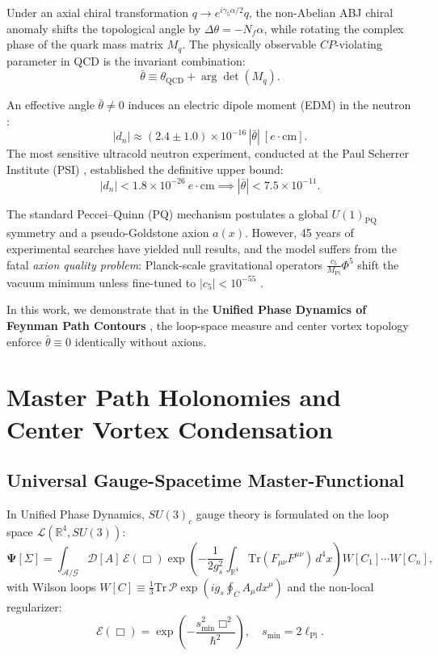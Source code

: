 \documentclass[11pt,a4paper]{article}
\begin{document}
Under an axial chiral transformation $q \to e^{i\gamma_5 \alpha/2} q$, the non-Abelian ABJ chiral anomaly shifts the topological angle by $\Delta\theta = -N_f \alpha$, while rotating the complex phase of the quark mass matrix $M_q$. The physically observable $CP$-violating parameter in QCD is the invariant combination:
\begin{equation}
\bar{\theta} \equiv \theta_{\mathrm{QCD}} + \arg\det(M_q).
\end{equation}

An effective angle $\bar{\theta} \ne 0$ induces an electric dipole moment (EDM) in the neutron \cite{Crewther1979}:
\begin{equation}
|d_n| \approx (2.4 \pm 1.0) \times 10^{-16} \, |\bar{\theta}| \ [e \cdot \text{cm}].
\end{equation}
The most sensitive ultracold neutron experiment, conducted at the Paul Scherrer Institute (PSI) \cite{Abel2020}, established the definitive upper bound:
\begin{equation}
|d_n| < 1.8 \times 10^{-26} \ e \cdot \text{cm} \implies |\bar{\theta}| < 7.5 \times 10^{-11}.
\end{equation}

The standard Peccei--Quinn (PQ) mechanism \cite{Peccei1977} postulates a global $U(1)_{\mathrm{PQ}}$ symmetry and a pseudo-Goldstone axion $a(x)$. However, 45 years of experimental searches have yielded null results, and the model suffers from the fatal \textit{axion quality problem}: Planck-scale gravitational operators $\frac{c_5}{M_{\mathrm{Pl}}}\Phi^5$ shift the vacuum minimum unless fine-tuned to $|c_5| < 10^{-55}$ \cite{Kamionkowski1992, Kallosh1995}.

In this work, we demonstrate that in the \textbf{Unified Phase Dynamics of Feynman Path Contours} \cite{Pavliuk2024_Monograph, Pavliuk2024_YM_Proof}, the loop-space measure and center vortex topology enforce $\bar{\theta} \equiv 0$ identically without axions.

\section{Master Path Holonomies and Center Vortex Condensation}

\subsection{Universal Gauge-Spacetime Master-Functional}
In Unified Phase Dynamics, $SU(3)_c$ gauge theory is formulated on the loop space $\mathcal{L}(\mathbb{R}^4, SU(3))$:
\begin{equation}
\mathbf{\Psi}[\Sigma] = \int_{\mathcal{A}/\mathcal{G}} \mathcal{D}[A] \, \mathcal{E}(\Box) \exp\left( -\frac{1}{2 g_s^2} \int_{\mathbb{R}^4} \mathrm{Tr}(F_{\mu\nu} F^{\mu\nu}) \, d^4x \right) W[C_1] \cdots W[C_n],
\end{equation}
with Wilson loops $W[C] \equiv \frac{1}{3} \mathrm{Tr} \, \mathcal{P} \exp\left( i g_s \oint_C A_\mu dx^\mu \right)$ and the non-local regularizer:
\begin{equation}
\mathcal{E}(\Box) = \exp\left( -\frac{s_{\min}^2 \Box^2}{\hbar^2} \right), \quad s_{\min} = 2\ell_{\mathrm{Pl}}.
\end{equation}
\end{document}
